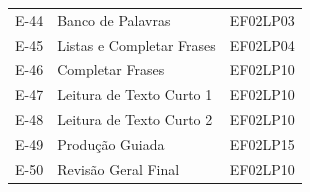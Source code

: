 \begin{center}
\begin{tabular}{lll}
E-44 & Banco de Palavras & EF02LP03 \\

E-45 & Listas e Completar Frases & EF02LP04 \\

E-46 & Completar Frases & EF02LP10 \\

E-47 & Leitura de Texto Curto 1 & EF02LP10 \\

E-48 & Leitura de Texto Curto 2 & EF02LP10 \\

E-49 & Produção Guiada & EF02LP15 \\

E-50 & Revisão Geral Final & EF02LP10 \\

\bottomrule
\end{tabular}\end{center}
